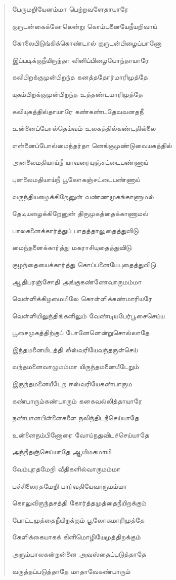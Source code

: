 \documentclass{article}
\begin{document}
\begin{quotation}
{பேருமறியேனம்மா பெற்றவளேதாயாரே

குருடன்கைக்கோலென்று கொம்பனையேநீயறிவாய்

கோலைபிடுங்கிக்கொண்டால் குருடன்பிழைப்பானோ

இப்படிக்குநீயிருந்தா லினிப்பிழையோந்தாயாரே

கலிபிறக்குமுன்பிறந்த கனத்ததோர்மாரிமுத்தே

யுகம்பிறக்குமுன்பிறந்த உத்தண்டமாரிமுத்தே

கலியுகத்தில்தாயாரே கண்கண்டதேவவனதநீ

உன்னைப்போல்தெய்வம் உலகத்தில்கண்டதில்லை

என்னைப்போல்மைந்தர்தா னெங்குமுண்டுவையகத்தில்

அனலைமதியாய்நீ யாவரையுஞ்சட்டைபண்ணாய்

புனலைமதியாய்நீ பூலோகஞ்சட்டைபண்ணாய்

வருந்தியழைக்கிறேனுன் வண்ணமுகங்காணாமல்

தேடியழைக்கிறேனுன்‌ திருமுகத்தைக்காணாமல்

‌பாலகனைக்கார்த்துப் பாதத்தாலுதைத்துவிடு

மைந்தனைக்கார்த்து மகராசியுதைத்துவிடு

குழந்தையைக்கார்த்து கொப்பனையேபுதைத்துவிடு

ஆதிபரஞ்சோதி அங்குகண்ணேவாருமம்மா

வெள்ளிக்கிழமையிலே கொள்ளிக்கண்மாரியரே

வெள்ளியிலுந்திங்களிலும் வேண்டியபேர்பூசைசெய்ய

பூசைமுகத்திற்குப் போனேனென்றுசொல்லாதே

இந்தமனையிடத்தி லீஸ்வரியேவந்தருள்செய்

வந்தமனைவாழுமம்மா யிருந்தமனையீடேறும்

இருந்தமனையீடேற ஈஸ்வரியேகண்பாரும

கண்பாரும்கண்பாரும் கனகவல்லித்தாயாரே

நண்பானபிள்ளைகளை நலிந்திடநீசெய்யாதே

உன்னைநம்பினோரை வோய்நதுவிடச்செய்யாதே

அந்நீதஞ்செய்யாதே ஆயிமகமாயி

வேம்புரதமேறி வீதிகளில்வாருமம்மா

பச்சிலைரதமேறி பார்வதியேவாருமம்மா

கொலுவிருந்தசத்தி கோர்த்தமுத்தைநீயிறக்கும்

போட்டமுத்தைநீயிறக்கும் பூலோகமாரிமுத்தே

கேளிக்கையாகக் கிளிமொழியேமுத்திறக்கும்

அரும்பாலகன்றன்னை அவஸ்தைப்படுத்தாதே

வருத்தப்படுத்தாதே மாதாவேகண்பாரும்

}
\end{quotation}
\end{document}
